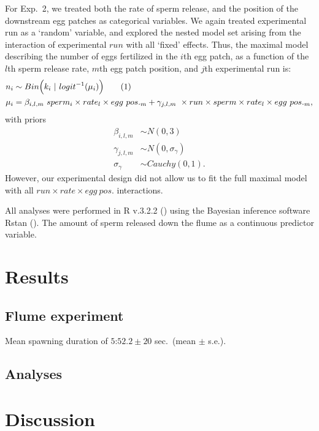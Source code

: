 \documentclass{article}
\newcommand\numberthis{\addtocounter{equation}{1}\tag{\theequation}}
\begin{document}
	For Exp.~2, we treated both the rate of sperm release, and the position of the downstream egg patches as categorical variables. We again treated experimental run as a `random' variable, and explored the nested model set arising from the interaction of experimental $run$ with all `fixed' effects. Thus, the maximal model describing the number of eggs fertilized in the $i$th egg patch, as a function of the $l$th sperm release rate, $m$th egg patch position, and $j$th experimental run is:
\begin{align*}
	n_i &\sim Bin\Big(k_i~|~logit^{-1}(\mu_i)\Big) \numberthis\\
	\mu_i &= \beta_{i,l,m}~sperm_i \times rate_l \times egg~pos._m + \gamma_{j,l,m}~\times run \times sperm \times rate_l \times egg~pos._m,
\end{align*}
\noindent{} with priors
\begin{align*}
	\beta_{i,l,m}   &\sim N(0,3) \\
	\gamma_{j,l,m}  &\sim N(0,\sigma_{\gamma}) \\
	\sigma_{\gamma} &\sim Cauchy(0,1).
\end{align*}
	\noindent{} However, our experimental design did not allow us to fit the full maximal model with all $run \times rate \times egg~pos.$ interactions.

	 All analyses were performed in R v.3.2.2 (\citealt{R2016}) using the Bayesian inference software Rstan (\citealt{Stan2016}). The amount of sperm released down the flume as a continuous predictor variable. 

\section*{Results}

	\subsection*{Flume experiment}

	Mean spawning duration of $5$:$52.2 \pm 20$ sec.~(mean $\pm$ s.e.).

	\subsection*{Analyses}


\section*{Discussion}
\end{document}
